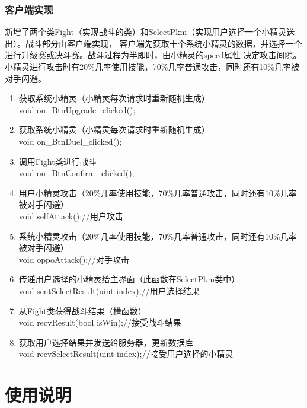 \documentclass{ctexart}
\begin{document}
\subsubsection{客户端实现}
新增了两个类Fight（实现战斗的类）和SelectPkm（实现用户选择一个小精灵送出）。战斗部分由客户端实现，
客户端先获取十个系统小精灵的数据，并选择一个进行升级赛或决斗赛。战斗过程为半即时，由小精灵的speed属性
决定攻击间隙。小精灵进行攻击时有20\%几率使用技能，70\%几率普通攻击，同时还有10\%几率被对手闪避。
\begin{enumerate}
  \item 获取系统小精灵（小精灵每次请求时重新随机生成）\\
    void on\_BtnUpgrade\_clicked();
  \item 获取系统小精灵（小精灵每次请求时重新随机生成）\\
    void on\_BtnDuel\_clicked();
  \item 调用Fight类进行战斗\\
    void on\_BtnConfirm\_clicked();
  \item 用户小精灵攻击（20\%几率使用技能，70\%几率普通攻击，同时还有10\%几率被对手闪避）\\
    void selfAttack();//用户攻击
  \item 系统小精灵攻击（20\%几率使用技能，70\%几率普通攻击，同时还有10\%几率被对手闪避）\\
    void oppoAttack();//对手攻击
  \item 传递用户选择的小精灵给主界面（此函数在SelectPkm类中）\\
    void sentSelectResult(uint index);//用户选择结果
  \item 从Fight类获得战斗结果（槽函数）\\
    void recvResult(bool isWin);//接受战斗结果
  \item 获取用户选择结果并发送给服务器，更新数据库\\
    void recvSelectResult(uint index);//接受用户选择的小精灵
\end{enumerate}

\section{使用说明}
\end{document}
